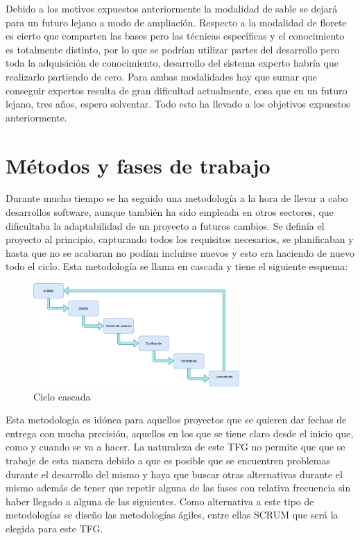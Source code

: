 \documentclass[11pt,a4paper,twoside,final]{article}
\begin{document}
\bigskip
Debido a los motivos expuestos anteriormente la modalidad de sable se dejará para un futuro lejano a modo de ampliación. Respecto a la modalidad de florete es cierto que comparten las bases pero las técnicas específicas y el conocimiento es totalmente distinto, por lo que se podrían utilizar partes del desarrollo pero toda la adquisición de conocimiento, desarrollo del sistema experto habría que realizarlo partiendo de cero. Para ambas modalidades hay que sumar que conseguir expertos resulta de gran dificultad actualmente, cosa que en un futuro lejano, tres años, espero solventar. Todo esto ha llevado a los objetivos expuestos anteriormente.

\fi


\newpage

\section{Métodos y fases de trabajo}

Durante mucho tiempo se ha seguido una metodología a la hora de llevar a cabo desarrollos software,
 aunque también ha sido empleada en otros sectores, que dificultaba la adaptabilidad de un proyecto
 a futuros cambios. Se definía el proyecto al principio, capturando todos los requisitos necesarios,
 se planificaban y hasta que no se acabaran no podían incluirse nuevos y esto era haciendo de nuevo
 todo el ciclo. Esta metodología se llama en cascada y tiene el siguiente esquema:

\begin{figure}[H]
  \centering
   \includegraphics[width=0.7\textwidth]{Cascada.pdf}
   \caption{Ciclo cascada}
  \label{Ciclo cascada}
\end{figure}

Esta metodología es idónea para aquellos proyectos que se quieren dar fechas de entrega con mucha precisión,
 aquellos en los que se tiene claro desde el inicio que, como y cuando se va a hacer. La naturaleza de
 este TFG no permite que que se trabaje de esta manera debido a que es posible que se encuentren problemas
 durante el desarrollo del mismo y haya que buscar otras alternativas durante el mismo además de tener
 que repetir alguna de las fases con relativa frecuencia sin haber llegado a alguna de las siguientes.
 Como alternativa a este tipo de metodologías se diseño las metodologías ágiles, entre ellas
 SCRUM \cite{scrum} que será la elegida para este TFG.
\end{document}
